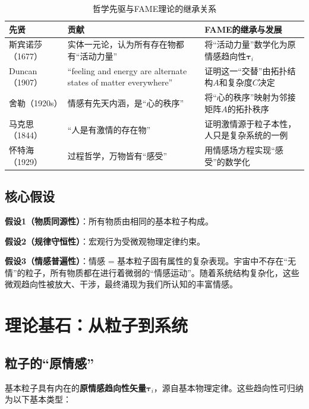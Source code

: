 \documentclass[12pt,a4paper]{article}
\theoremstyle{plain}
\newcommand{\ve}[1]{\bm{#1}}                    %
\newcommand{\tauvec}{\ve{\tau}}                   %
\begin{document}
\begin{table}[h]
\centering
\caption{哲学先驱与FAME理论的继承关系}
\begin{tabular}{p{4cm}p{5cm}p{5cm}}
\toprule
\textbf{先贤} & \textbf{贡献} & \textbf{FAME的继承与发展} \\
\midrule
斯宾诺莎（1677） & 实体一元论，认为所有存在物都有“活动力量” & 将“活动力量”数学化为原情感趋向性$\tauvec_i$ \\
Duncan（1907） & “feeling and energy are alternate states of matter everywhere” & 证明这一“交替”由拓扑结构$A$和复杂度$C$决定 \\
舍勒（1920s） & 情感有先天内涵，是“心的秩序” & 将“心的秩序”映射为邻接矩阵$A$的拓扑秩序 \\
马克思（1844） & “人是有激情的存在物” & 证明激情源于粒子本性，人只是复杂系统的一例 \\
怀特海（1929） & 过程哲学，万物皆有“感受” & 用情感场方程实现“感受”的数学化 \\
\bottomrule
\end{tabular}
\end{table}

\subsection{核心假设}

\textbf{假设1（物质同源性）}：所有物质由相同的基本粒子构成。

\textbf{假设2（规律守恒性）}：宏观行为受微观物理定律约束。

\textbf{假设3（情感普遍性）}：情感 = 基本粒子固有属性的复杂表现。宇宙中不存在“无情”的粒子，所有物质都在进行着微弱的“情感运动”。随着系统结构复杂化，这些微观趋向性被放大、干涉，最终涌现为我们所认知的丰富情感。

\section{理论基石：从粒子到系统}

\subsection{粒子的“原情感”}

基本粒子具有内在的\textbf{原情感趋向性矢量}$\ve{\tau}_i$，源自基本物理定律。这些趋向性可归纳为以下基本类型：
\end{document}
